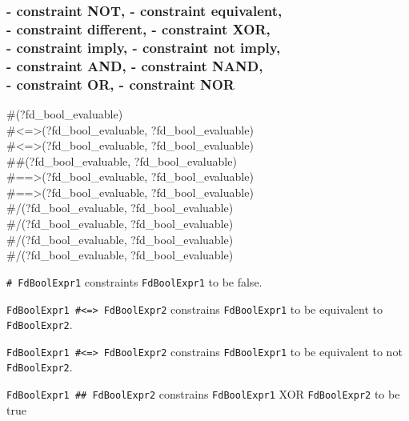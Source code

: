 \subsubsection{ - constraint NOT,
                - constraint equivalent, \\
                - constraint different,
                - constraint XOR, \\
                - constraint imply,
                - constraint not imply, \\
                - constraint AND,
                - constraint NAND, \\
                - constraint OR,
                - constraint NOR}

\begin{TemplatesOneCol}
\#{\bs}(?fd\_bool\_evaluable)\\
\#<=>(?fd\_bool\_evaluable, ?fd\_bool\_evaluable)\\
\#{\bs}<=>(?fd\_bool\_evaluable, ?fd\_bool\_evaluable)\\
\#\#(?fd\_bool\_evaluable, ?fd\_bool\_evaluable)\\
\#==>(?fd\_bool\_evaluable, ?fd\_bool\_evaluable)\\
\#{\bs}==>(?fd\_bool\_evaluable, ?fd\_bool\_evaluable)\\
\#/{\bs}(?fd\_bool\_evaluable, ?fd\_bool\_evaluable)\\
\#{\bs}/{\bs}(?fd\_bool\_evaluable, ?fd\_bool\_evaluable)\\
\#{\bs}/(?fd\_bool\_evaluable, ?fd\_bool\_evaluable)\\
\#{\bs}{\bs}/(?fd\_bool\_evaluable, ?fd\_bool\_evaluable)

\end{TemplatesOneCol}

\Description

\texttt{\#{\bs} FdBoolExpr1} constraints \texttt{FdBoolExpr1} to be
false.

\texttt{FdBoolExpr1 \#<=> FdBoolExpr2} constrains
\texttt{FdBoolExpr1} to be equivalent to \texttt{FdBoolExpr2}.

\texttt{FdBoolExpr1 \#{\bs}<=> FdBoolExpr2} constrains
\texttt{FdBoolExpr1} to be equivalent to not \texttt{FdBoolExpr2}.

\texttt{FdBoolExpr1 \#\# FdBoolExpr2} constrains \texttt{FdBoolExpr1} XOR
\texttt{FdBoolExpr2} to be true

